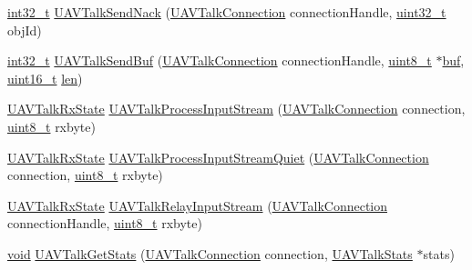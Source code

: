 \begin{DoxyCompactItemize}
\item 
\hyperlink{group___n_a_m_e_gafd12020da5a235dfcf0c3c748fb5baed}{int32\-\_\-t} \hyperlink{group___open_pilot_libraries_ga2ef859d444a819ed3e3bb4ea36761c69}{U\-A\-V\-Talk\-Send\-Nack} (\hyperlink{group___open_pilot_libraries_gaeff1721eaebd4ab306057b4017f23f36}{U\-A\-V\-Talk\-Connection} connection\-Handle, \hyperlink{stdint_8h_a435d1572bf3f880d55459d9805097f62}{uint32\-\_\-t} obj\-Id)
\item 
\hyperlink{group___n_a_m_e_gafd12020da5a235dfcf0c3c748fb5baed}{int32\-\_\-t} \hyperlink{group___open_pilot_libraries_ga75dcc116d1af9cb73a58c233a2d95bed}{U\-A\-V\-Talk\-Send\-Buf} (\hyperlink{group___open_pilot_libraries_gaeff1721eaebd4ab306057b4017f23f36}{U\-A\-V\-Talk\-Connection} connection\-Handle, \hyperlink{stdint_8h_aba7bc1797add20fe3efdf37ced1182c5}{uint8\-\_\-t} $\ast$\hyperlink{mavlink__helpers_8h_af5c51bef7cca88bcb22f0517fdb06153}{buf}, \hyperlink{stdint_8h_a273cf69d639a59973b6019625df33e30}{uint16\-\_\-t} \hyperlink{mavlink__helpers_8h_aba59486c1504340293255a065b546e3a}{len})
\item 
\hyperlink{group___open_pilot_libraries_ga8a49dc52ac01b5d0782811f284df691c}{U\-A\-V\-Talk\-Rx\-State} \hyperlink{group___open_pilot_libraries_ga1a738a506f26790d1b9c9fac5b6e1d92}{U\-A\-V\-Talk\-Process\-Input\-Stream} (\hyperlink{group___open_pilot_libraries_gaeff1721eaebd4ab306057b4017f23f36}{U\-A\-V\-Talk\-Connection} connection, \hyperlink{stdint_8h_aba7bc1797add20fe3efdf37ced1182c5}{uint8\-\_\-t} rxbyte)
\item 
\hyperlink{group___open_pilot_libraries_ga8a49dc52ac01b5d0782811f284df691c}{U\-A\-V\-Talk\-Rx\-State} \hyperlink{group___open_pilot_libraries_ga174ffb688889f75507fc022eaf33d52e}{U\-A\-V\-Talk\-Process\-Input\-Stream\-Quiet} (\hyperlink{group___open_pilot_libraries_gaeff1721eaebd4ab306057b4017f23f36}{U\-A\-V\-Talk\-Connection} connection, \hyperlink{stdint_8h_aba7bc1797add20fe3efdf37ced1182c5}{uint8\-\_\-t} rxbyte)
\item 
\hyperlink{group___open_pilot_libraries_ga8a49dc52ac01b5d0782811f284df691c}{U\-A\-V\-Talk\-Rx\-State} \hyperlink{group___open_pilot_libraries_ga11bfbe431f2e79f43a4321b942dc94c8}{U\-A\-V\-Talk\-Relay\-Input\-Stream} (\hyperlink{group___open_pilot_libraries_gaeff1721eaebd4ab306057b4017f23f36}{U\-A\-V\-Talk\-Connection} connection\-Handle, \hyperlink{stdint_8h_aba7bc1797add20fe3efdf37ced1182c5}{uint8\-\_\-t} rxbyte)
\item 
\hyperlink{group___n_a_m_e_ga18028b8badbf1ea7e704ccac3c488e82}{void} \hyperlink{group___open_pilot_libraries_gaeccb32b1562a98d5586bb3d4d25715ee}{U\-A\-V\-Talk\-Get\-Stats} (\hyperlink{group___open_pilot_libraries_gaeff1721eaebd4ab306057b4017f23f36}{U\-A\-V\-Talk\-Connection} connection, \hyperlink{struct_u_a_v_talk_stats}{U\-A\-V\-Talk\-Stats} $\ast$stats)

\end{DoxyCompactItemize}

